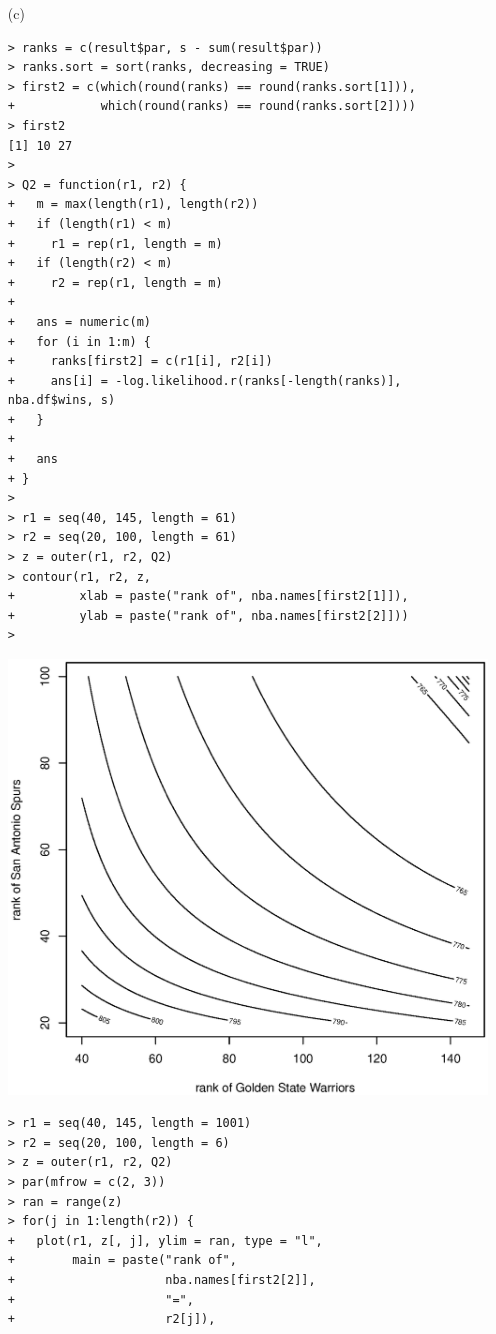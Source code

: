 \documentclass[11pt]{report}
\theoremstyle{definition}
\theoremstyle{remark}
\begin{document}
\begin{enumerate}
\begin{enumerate}
\begin{verbatim}
> \end{verbatim}
 	    \item[(c)] \begin{verbatim}> ranks = c(result$par, s - sum(result$par))
> ranks.sort = sort(ranks, decreasing = TRUE)
> first2 = c(which(round(ranks) == round(ranks.sort[1])), 
+            which(round(ranks) == round(ranks.sort[2])))
> first2
[1] 10 27
> 
> Q2 = function(r1, r2) {
+   m = max(length(r1), length(r2))
+   if (length(r1) < m)
+     r1 = rep(r1, length = m)
+   if (length(r2) < m)
+     r2 = rep(r1, length = m)
+   
+   ans = numeric(m)
+   for (i in 1:m) {
+     ranks[first2] = c(r1[i], r2[i])
+     ans[i] = -log.likelihood.r(ranks[-length(ranks)], nba.df$wins, s)
+   }
+   
+   ans
+ }
> 
> r1 = seq(40, 145, length = 61)
> r2 = seq(20, 100, length = 61)
> z = outer(r1, r2, Q2)
> contour(r1, r2, z,
+         xlab = paste("rank of", nba.names[first2[1]]),
+         ylab = paste("rank of", nba.names[first2[2]]))
> \end{verbatim}
    \includegraphics[width=\textwidth]{a2_contour.eps}
    \begin{verbatim}> r1 = seq(40, 145, length = 1001)
> r2 = seq(20, 100, length = 6)
> z = outer(r1, r2, Q2)
> par(mfrow = c(2, 3))
> ran = range(z)
> for(j in 1:length(r2)) {
+   plot(r1, z[, j], ylim = ran, type = "l",
+        main = paste("rank of", 
+                     nba.names[first2[2]], 
+                     "=", 
+                     r2[j]),

\end{verbatim}
\end{enumerate}
\end{enumerate}
\end{document}
